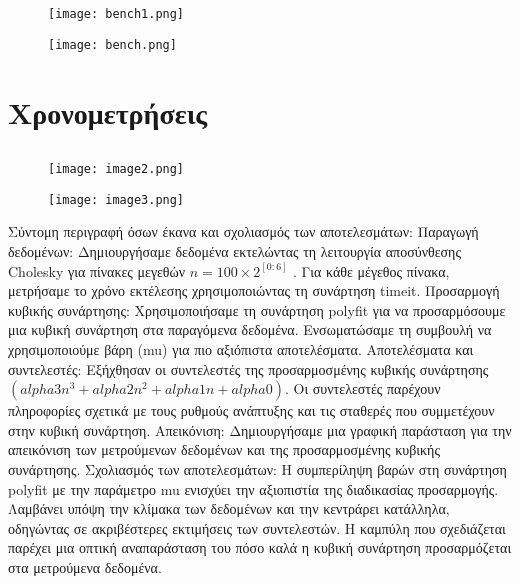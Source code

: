\documentclass[12pt,a4paper]{article}
\begin{document}
\begin{figure}[h]
\centering
\texttt{[image: bench1.png]} %
\label{fig:image1}
\end{figure}

\begin{figure}[h]
\centering
\texttt{[image: bench.png]} %
\label{fig:image2}
\end{figure}
\FloatBarrier %

\section{Χρονομετρήσεις}
\subsection{}
\begin{figure}[h]
\centering
\texttt{[image: image2.png]} %
\label{fig:image3}
\end{figure}
\begin{figure}[h]
\centering
\texttt{[image: image3.png]} %
\label{fig:image4}
\end{figure}
\FloatBarrier %
Σύντομη περιγραφή όσων έκανα και σχολιασμός των αποτελεσμάτων:
Παραγωγή δεδομένων: Δημιουργήσαμε δεδομένα εκτελώντας τη λειτουργία αποσύνθεσης Cholesky για πίνακες μεγεθών $n = 100 \times 2^{[0:6]}$
. Για κάθε μέγεθος πίνακα, μετρήσαμε το χρόνο εκτέλεσης χρησιμοποιώντας τη συνάρτηση timeit.
Προσαρμογή κυβικής συνάρτησης: Χρησιμοποιήσαμε τη συνάρτηση polyfit για να προσαρμόσουμε μια κυβική συνάρτηση στα παραγόμενα δεδομένα. Ενσωματώσαμε τη συμβουλή να χρησιμοποιούμε βάρη (mu) για πιο αξιόπιστα αποτελέσματα.
Αποτελέσματα και συντελεστές: Εξήχθησαν οι συντελεστές της προσαρμοσμένης κυβικής συνάρτησης $(alpha3n^3 + alpha2n^2 + alpha1n + alpha0)$. Οι συντελεστές παρέχουν πληροφορίες σχετικά με τους ρυθμούς ανάπτυξης και τις σταθερές που συμμετέχουν στην κυβική συνάρτηση.
Απεικόνιση: Δημιουργήσαμε μια γραφική παράσταση για την απεικόνιση των μετρούμενων δεδομένων και της προσαρμοσμένης κυβικής συνάρτησης.
Σχολιασμός των αποτελεσμάτων: Η συμπερίληψη βαρών στη συνάρτηση polyfit με την παράμετρο mu ενισχύει την αξιοπιστία της διαδικασίας προσαρμογής. Λαμβάνει υπόψη την κλίμακα των δεδομένων και την κεντράρει κατάλληλα, οδηγώντας σε ακριβέστερες εκτιμήσεις των συντελεστών. Η καμπύλη που σχεδιάζεται παρέχει μια οπτική αναπαράσταση του πόσο καλά η κυβική συνάρτηση προσαρμόζεται στα μετρούμενα δεδομένα.
\end{document}
